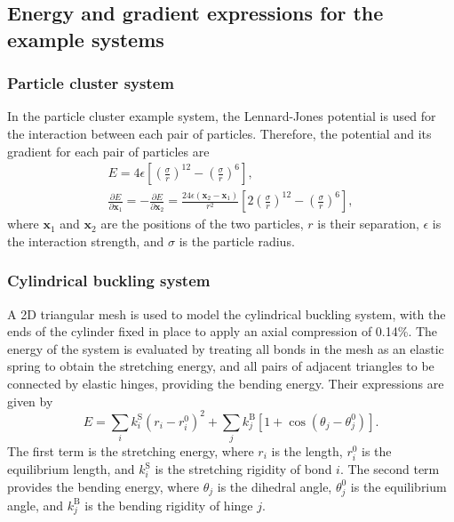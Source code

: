 \documentclass[twocolumn,10pt]{revtex4}
\newcommand{\bm}[1]{\boldsymbol{\mathbf{#1}}}
\begin{document}
\subsection{Energy and gradient expressions for the example systems}
\subsubsection{Particle cluster system}
In the particle cluster example system, the Lennard-Jones potential is used for the interaction between each pair of particles.
Therefore, the potential and its gradient for each pair of particles are
\begin{gather}
  E = 4\epsilon \left[ \left(\frac{\sigma}{r}\right)^{12} - \left(\frac{\sigma}{r}\right)^6 \right], \\
  \frac{\partial E}{\partial \bm{x}_1} = -\frac{\partial E}{\partial \bm{x}_2} =
    \frac{24 \epsilon (\bm{x}_2 - \bm{x}_1)}{r^2} \left[ 2 \left(\frac{\sigma}{r}\right)^{12} - \left(\frac{\sigma}{r}\right)^6 \right],
\end{gather}
where $\bm{x}_1$ and $\bm{x}_2$ are the positions of the two particles, $r$ is their separation, $\epsilon$ is the interaction strength, and $\sigma$ is the particle radius.

\subsubsection{Cylindrical buckling system}
A 2D triangular mesh is used to model the cylindrical buckling system, with the ends of the cylinder fixed in place to apply an axial compression of 0.14\%.
The energy of the system is evaluated by treating all bonds in the mesh as an elastic spring to obtain the stretching energy, and all pairs of adjacent triangles to be connected by elastic hinges, providing the bending energy.
Their expressions are given by
\begin{equation}
  E = \sum_i k^\mathrm{S}_i (r_i - r^0_i)^2 + \sum_j k^\mathrm{B}_j [1 + \cos(\theta_j - \theta^0_j)].
\end{equation}
The first term is the stretching energy, where $r_i$ is the length, $r^0_i$ is the equilibrium length, and $k^\mathrm{S}_i$ is the stretching rigidity of bond $i$.
The second term provides the bending energy, where $\theta_j$ is the dihedral angle, $\theta^0_j$ is the equilibrium angle, and $k^\mathrm{B}_j$ is the bending rigidity of hinge $j$.
\end{document}

